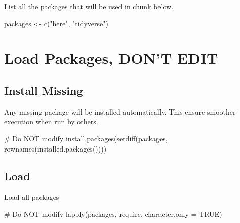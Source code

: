 \documentclass[
  letterpaper,
  DIV=11,
  numbers=noendperiod]{scrreprt}
\newenvironment{Shaded}{\begin{snugshade}}{\end{snugshade}}
\newcommand{\AttributeTok}[1]{\textcolor[rgb]{0.40,0.45,0.13}{#1}}
\newcommand{\CommentTok}[1]{\textcolor[rgb]{0.37,0.37,0.37}{#1}}
\newcommand{\ConstantTok}[1]{\textcolor[rgb]{0.56,0.35,0.01}{#1}}
\newcommand{\FunctionTok}[1]{\textcolor[rgb]{0.28,0.35,0.67}{#1}}
\newcommand{\NormalTok}[1]{\textcolor[rgb]{0.00,0.23,0.31}{#1}}
\newcommand{\OtherTok}[1]{\textcolor[rgb]{0.00,0.23,0.31}{#1}}
\newcommand{\StringTok}[1]{\textcolor[rgb]{0.13,0.47,0.30}{#1}}
\begin{document}

List all the packages that will be used in chunk below.

\begin{Shaded}
\begin{Highlighting}[]
\NormalTok{packages }\OtherTok{\textless{}{-}} \FunctionTok{c}\NormalTok{(}\StringTok{"here"}\NormalTok{, }\StringTok{"tidyverse"}\NormalTok{)}
\end{Highlighting}
\end{Shaded}

\section*{Load Packages, DON'T EDIT}\label{sec-packages}


\subsection*{Install Missing}\label{install-missing}

Any missing package will be installed automatically. This ensure
smoother execution when run by others.

\begin{Shaded}
\begin{Highlighting}[]
\CommentTok{\# Do NOT modify}
\FunctionTok{install.packages}\NormalTok{(}\FunctionTok{setdiff}\NormalTok{(packages, }\FunctionTok{rownames}\NormalTok{(}\FunctionTok{installed.packages}\NormalTok{())))}
\end{Highlighting}
\end{Shaded}

\subsection*{Load}\label{load}

Load all packages

\begin{Shaded}
\begin{Highlighting}[]
\CommentTok{\# Do NOT modify}
\FunctionTok{lapply}\NormalTok{(packages, require, }\AttributeTok{character.only =} \ConstantTok{TRUE}\NormalTok{)}
\end{Highlighting}
\end{Shaded}
\end{document}
